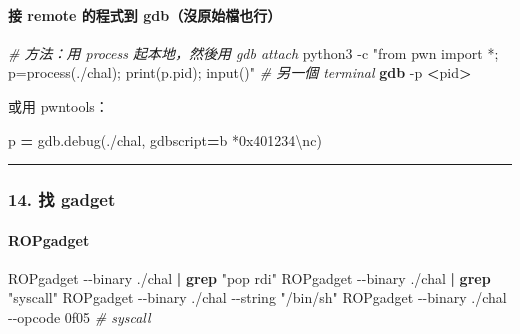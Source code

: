 \documentclass[10pt,a4paper]{article}
\newenvironment{Shaded}{\begin{snugshade}}{\end{snugshade}}
\newcommand{\AttributeTok}[1]{\textcolor[rgb]{0.13,0.29,0.53}{#1}}
\newcommand{\CharTok}[1]{\textcolor[rgb]{0.31,0.60,0.02}{#1}}
\newcommand{\CommentTok}[1]{\textcolor[rgb]{0.56,0.35,0.01}{\textit{#1}}}
\newcommand{\ExtensionTok}[1]{#1}
\newcommand{\FunctionTok}[1]{\textcolor[rgb]{0.13,0.29,0.53}{\textbf{#1}}}
\newcommand{\KeywordTok}[1]{\textcolor[rgb]{0.13,0.29,0.53}{\textbf{#1}}}
\newcommand{\NormalTok}[1]{#1}
\newcommand{\OperatorTok}[1]{\textcolor[rgb]{0.81,0.36,0.00}{\textbf{#1}}}
\newcommand{\StringTok}[1]{\textcolor[rgb]{0.31,0.60,0.02}{#1}}
\renewenvironment{Shaded}{%
  \def\FrameCommand{\fboxsep=3.2pt\colorbox{shadecolor}}%
  \MakeFramed{\advance\hsize-\width\FrameRestore\small}%
}{%
  \endMakeFramed
}
\begin{document}
\paragraph{接 remote 的程式到
gdb（沒原始檔也行）}\label{ux63a5-remote-ux7684ux7a0bux5f0fux5230-gdbux6c92ux539fux59cbux6a94ux4e5fux884c}

\begin{Shaded}
\begin{Highlighting}[]
\CommentTok{\# 方法：用 process 起本地，然後用 gdb attach}
\ExtensionTok{python3} \AttributeTok{{-}c} \StringTok{"from pwn import *; p=process(\textquotesingle{}./chal\textquotesingle{}); print(p.pid); input()"}
\CommentTok{\# 另一個 terminal}
\FunctionTok{gdb} \AttributeTok{{-}p} \OperatorTok{\textless{}}\NormalTok{pid}\OperatorTok{\textgreater{}}
\end{Highlighting}
\end{Shaded}

或用 pwntools：

\begin{Shaded}
\begin{Highlighting}[]
\NormalTok{p }\OperatorTok{=}\NormalTok{ gdb.debug(}\StringTok{\textquotesingle{}./chal\textquotesingle{}}\NormalTok{, gdbscript}\OperatorTok{=}\StringTok{\textquotesingle{}b *0x401234}\CharTok{\textbackslash{}n}\StringTok{c\textquotesingle{}}\NormalTok{)}
\end{Highlighting}
\end{Shaded}

\begin{center}\rule{0.5\linewidth}{0.5pt}\end{center}

\subsubsection{14. 找 gadget}\label{ux627e-gadget}

\paragraph{ROPgadget}\label{ropgadget}

\begin{Shaded}
\begin{Highlighting}[]
\ExtensionTok{ROPgadget} \AttributeTok{{-}{-}binary}\NormalTok{ ./chal }\KeywordTok{|} \FunctionTok{grep} \StringTok{"pop rdi"}
\ExtensionTok{ROPgadget} \AttributeTok{{-}{-}binary}\NormalTok{ ./chal }\KeywordTok{|} \FunctionTok{grep} \StringTok{"syscall"}
\ExtensionTok{ROPgadget} \AttributeTok{{-}{-}binary}\NormalTok{ ./chal }\AttributeTok{{-}{-}string} \StringTok{"/bin/sh"}
\ExtensionTok{ROPgadget} \AttributeTok{{-}{-}binary}\NormalTok{ ./chal }\AttributeTok{{-}{-}opcode}\NormalTok{ 0f05      }\CommentTok{\# syscall}
\end{Highlighting}
\end{Shaded}
\end{document}
